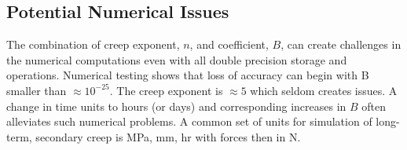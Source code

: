 \documentclass[11pt]{report}
\numberwithin{equation}{section}
\begin{document}
\subsection{Potential Numerical Issues}
The combination of creep exponent, $n$, and coefficient, $B$, can create 
challenges in the numerical computations even with all double precision
storage and operations. Numerical testing shows that loss of accuracy 
can begin with B smaller than $\approx 10^{-25}$. The creep exponent
is  $\approx 5$ which seldom creates issues. A change in time units to hours
(or days) and corresponding increases in $B$ often alleviates 
such numerical problems. A common set of units for simulation of
long-term, secondary creep is MPa, mm, hr with forces then in N.
\end{document}
